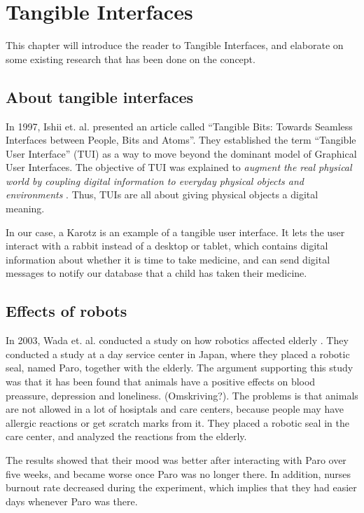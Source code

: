 \chapter{Tangible Interfaces}
\label{chp:tangibleinterfaces}

This chapter will introduce the reader to Tangible Interfaces, and elaborate on some existing research that has been done on the concept.   

\section{About tangible interfaces}

In 1997, Ishii et. al. presented an article called ``Tangible Bits: Towards Seamless Interfaces between People, Bits and Atoms''. They established the term ``Tangible User Interface'' (TUI) as a way to move beyond the dominant model of Graphical User Interfaces. The objective of TUI was explained to \emph{augment the real physical world by coupling digital information to everyday physical objects and environments} \cite{ishii1997tangible}. Thus, TUIs are all about giving physical objects a digital meaning.   


In our case, a Karotz is an example of a tangible user interface. It lets the user interact with a rabbit instead of a desktop or tablet, which contains digital information about whether it is time to take medicine, and can send digital messages to notify our database that a child has taken their medicine.      


\section{Effects of robots}

In 2003, Wada et. al. conducted a study on how robotics affected elderly \cite{wada2004effects}. They conducted a study at a day service center in Japan, where they placed a robotic seal, named Paro, together with the elderly. The argument supporting this study was that it has been found that animals have a positive effects on blood preassure, depression and loneliness. (Omskriving?). The problems is that animals are not allowed in a lot of hosiptals and care centers, because people may have allergic reactions or get scratch marks from it. They placed a robotic seal in the care center, and analyzed the reactions from the elderly. 

The results showed that their mood was better after interacting with Paro over five weeks, and became worse once Paro was no longer there. In addition, nurses burnout rate decreased during the experiment, which implies that they had easier days whenever Paro was there.          

